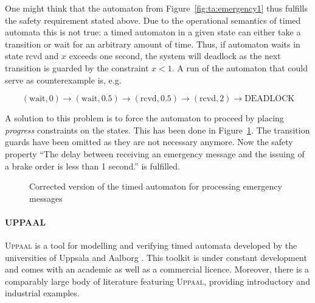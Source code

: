 One might think that the automaton from Figure~\ref{fig:ta:emergency1}
thus fulfills the safety requirement stated above. Due to the
operational semantics of timed automata this is not true: a timed
automaton in a given state can either take a transition or wait for an
arbitrary amount of time. Thus, if automaton waits in state rcvd and
$x$ exceeds one second, the system will deadlock as the next
transition is guarded by the constraint $x<1$. A run of the automaton
that could serve as counterexample is, e.g.

$$(\mathrm{wait},0)\rightarrow(\mathrm{wait},0.5)\rightarrow(\mathrm{rcvd},0.5)\rightarrow(\mathrm{rcvd},2)\rightarrow\textrm{DEADLOCK}$$

A solution to this problem is to force the automaton to proceed by
placing \emph{progress} constraints on the states. This has been done
in Figure~\ref{fig:ta:emergency2}. The transition guards have been
omitted as they are not necessary anymore. Now the safety property
``The delay between receiving an emergency message and the issuing of
a brake order is less than 1 second.'' is fulfilled.

\begin{figure}
\begin{center}
\small
{}
\end{center}
\caption{Corrected version of the timed automaton for processing
  emergency messages}
\label{fig:ta:emergency2}
\end{figure}

\paragraph{UPPAAL}

\textsc{Uppaal} is a tool for modelling and verifying timed automata
developed by the universities of Uppsala and Aalborg
\cite{UppaalTutorial04}. This toolkit is under constant development
and comes with an academic as well as a commercial licence. Moreover,
there is a comparably large body of literature featuring
\textsc{Uppaal}, providing introductory and industrial examples.

